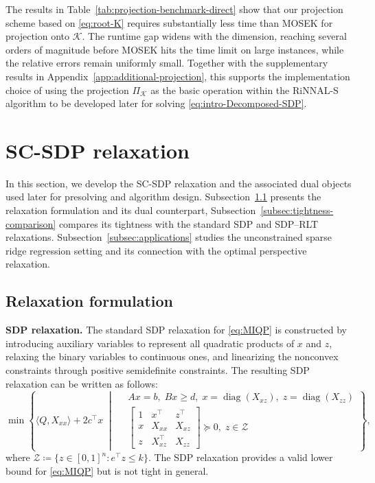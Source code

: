 \documentclass[11pt]{article}
\DeclareMathOperator{\diag}{diag}
\def\K{\mathcal{K}}
\def\Z{\mathcal{Z}}
\def\tb#1{\textbf{#1}}
\theoremstyle{plain}
\begin{document}
{The results in Table~\ref{tab:projection-benchmark-direct} show that our projection scheme based on \eqref{eq:root-K} requires substantially less time than MOSEK for projection onto $\K$. The runtime gap widens with the dimension, reaching several orders of magnitude before MOSEK hits the time limit on large instances, while the relative errors remain uniformly small. Together with the supplementary results in Appendix~\ref{app:additional-projection}, this supports the implementation choice of using the projection $\Pi_\K$ as the basic 
operation within the RiNNAL-S algorithm to be developed
later for solving \eqref{eq:intro-Decomposed-SDP}.
}




\section{SC-SDP relaxation}\label{sec:sc-sdp}


In this section, we develop the SC-SDP relaxation and the associated dual objects used later for presolving and algorithm design. Subsection~\ref{subsec:relaxation-formulation} presents the relaxation formulation and its dual counterpart, Subsection~\ref{subsec:tightness-comparison} compares its tightness with the standard SDP and SDP--RLT relaxations. Subsection~\ref{subsec:applications} studies the unconstrained sparse ridge regression setting and its connection with the optimal perspective relaxation.

\subsection{Relaxation formulation}\label{subsec:relaxation-formulation}

\noindent\tb{SDP relaxation.}
The standard SDP relaxation for \eqref{eq:MIQP} is constructed by introducing auxiliary variables to represent all quadratic products of $x$ and $z$, relaxing the binary variables to continuous ones, and linearizing the nonconvex constraints through positive semidefinite constraints. The resulting SDP relaxation can be written as follows:
\begin{equation}\label{eq:Shor}
\min\left\{
\langle Q,X_{xx} \rangle+2c^\top x  \;\middle|\;
\begin{aligned}
&Ax=b,\;Bx\geq d,\; x = \diag(X_{xz}),\; z = \diag(X_{zz})\\
& 
\begin{bmatrix}
    1&x^\top & z^\top\\
    x&X_{xx} & X_{xz}\\
    z&X_{xz}^\top & X_{zz}
\end{bmatrix}\succeq 0,\; z\in \Z
\end{aligned}
\right\},
\end{equation}
where $\mathcal{Z}\coloneqq\{z\in [0,1]^n: e^\top z \le k\}$.
The SDP relaxation provides a valid lower bound for \eqref{eq:MIQP} but is not tight in general.
\end{document}
